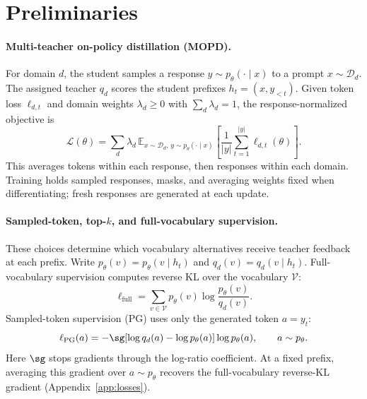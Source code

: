 \section{Preliminaries}
\label{sec:setting}

\paragraph{Multi-teacher on-policy distillation (MOPD).}
For domain $d$, the student samples a response $y\sim p_\theta(\cdot\mid x)$ to a prompt $x\sim\mathcal D_d$. The assigned teacher $q_d$ scores the student prefixes $h_t=(x,y_{<t})$. Given token loss $\ell_{d,t}$ and domain weights $\lambda_d\geq0$ with $\sum_d\lambda_d=1$, the response-normalized objective is
\begin{equation}
\mathcal L(\theta)=\sum_d\lambda_d\,
\mathbb E_{x\sim\mathcal D_d,\,y\sim p_\theta(\cdot\mid x)}
\left[\frac{1}{|y|}\sum_{t=1}^{|y|}\ell_{d,t}(\theta)\right].
\label{eq:mopd}
\end{equation}
This averages tokens within each response, then responses within each domain. Training holds sampled responses, masks, and averaging weights fixed when differentiating; fresh responses are generated at each update.

\paragraph{Sampled-token, top-$k$, and full-vocabulary supervision.}
These choices determine which vocabulary alternatives receive teacher feedback at each prefix. Write $p_\theta(v)=p_\theta(v\mid h_t)$ and $q_d(v)=q_d(v\mid h_t)$. Full-vocabulary supervision computes reverse KL over the vocabulary $\mathcal V$:
\begin{equation}
\ell_{\mathrm{full}}=\sum_{v\in\mathcal V}p_\theta(v)\log\frac{p_\theta(v)}{q_d(v)}.
\label{eq:full}
\end{equation}
Sampled-token supervision (PG) uses only the generated token $a=y_t$:
\begin{equation}
\ell_{\mathrm{PG}}(a)=-\sg[\log q_d(a)-\log p_\theta(a)]\log p_\theta(a),
\qquad a\sim p_\theta.
\label{eq:pg}
\end{equation}
Here $\sg$ stops gradients through the log-ratio coefficient. At a fixed prefix, averaging this gradient over $a\sim p_\theta$ recovers the full-vocabulary reverse-KL gradient (Appendix~\ref{app:losses}).

